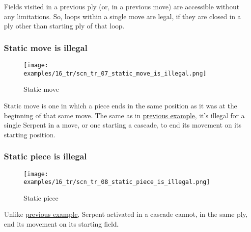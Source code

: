 Fields visited in a previous ply (or, in a previous move) are accessible
without any limitations. So, loops within a single move are legal, if they
are closed in a ply other than starting ply of that loop.

\clearpage %

\subsubsection*{Static move is illegal}
\label{sec:Tamoanchan Revisited/Serpent/Movement/Static move is illegal}

\noindent
\begin{wrapfigure}[8]{l}{0.4\textwidth}
\centering
\texttt{[image: examples/16\_tr/scn\_tr\_07\_static\_move\_is\_illegal.png]}
\caption{Static move}
\label{fig:scn_tr_07_static_move_is_illegal}
\end{wrapfigure}
Static move is one in which a piece ends in the same position as it was at the
beginning of that same move. The same as in
\hyperref[fig:scn_mv_43_static_move_is_illegal_init]{previous example}, it's
illegal for a single Serpent in a move, or one starting a cascade, to end its
movement on its starting position.


\vspace*{1.4\baselineskip}
\subsubsection*{Static piece is illegal}
\label{sec:Tamoanchan Revisited/Serpent/Movement/Static piece is illegal}

\noindent
\begin{wrapfigure}[9]{l}{0.4\textwidth}
\centering
\texttt{[image: examples/16\_tr/scn\_tr\_08\_static\_piece\_is\_illegal.png]}
\caption{Static piece}
\label{fig:scn_tr_08_static_piece_is_illegal}
\end{wrapfigure}
Unlike
\hyperref[fig:scn_mv_45_static_piece_is_legal_init]{previous example}, Serpent
activated in a cascade cannot, in the same ply, end its movement on its starting
field.

